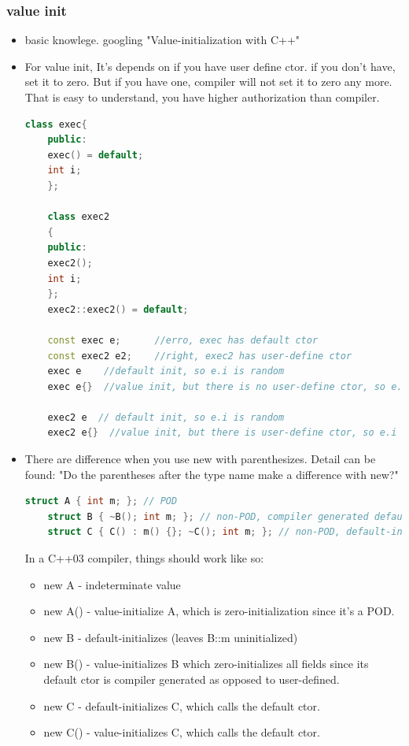\documentclass[a4paper,12pt,twoside]{book}
\begin{document}
\subsubsection{value init}
\begin{itemize}
	\item basic knowlege. googling "Value-initialization with C++"
	
	\item For value init, It's depends on if you have user define ctor. if you don't have, set it to zero. But if you have one, compiler will not set it to zero any more. That is easy to understand, you have higher authorization than compiler. 
	\begin{lstlisting}[frame=single, language=c++]
	class exec{
	public:
	exec() = default;
	int i;
	};
	
	class exec2
	{
	public:
	exec2();
	int i;
	};
	exec2::exec2() = default;
	
	const exec e;      //erro, exec has default ctor
	const exec2 e2;    //right, exec2 has user-define ctor
	exec e    //default init, so e.i is random
	exec e{}  //value init, but there is no user-define ctor, so e.i == 0
	
	exec2 e  // default init, so e.i is random
	exec2 e{}  //value init, but there is user-define ctor, so e.i is random
	\end{lstlisting}
	
	\item There are difference when you use new with parenthesizes. Detail can be found: "Do the parentheses after the type name make a difference with new?"
	
	\begin{lstlisting}[frame=single, language=c++]
	struct A { int m; }; // POD
	struct B { ~B(); int m; }; // non-POD, compiler generated default ctor
	struct C { C() : m() {}; ~C(); int m; }; // non-POD, default-initialising m
	\end{lstlisting}
	
	In a C++03 compiler, things should work like so:
	\begin{itemize}
		\item new A - indeterminate value
		\item new A() - value-initialize A, which is zero-initialization since it's a POD.
		
		\item new B - default-initializes (leaves B::m uninitialized)
		
		\item new B() - value-initializes B which zero-initializes all fields since its default ctor is compiler generated as opposed to user-defined.
		
		\item new C - default-initializes C, which calls the default ctor.
		
		\item new C() - value-initializes C, which calls the default ctor.
	\end{itemize}
\end{itemize}
\end{document}
